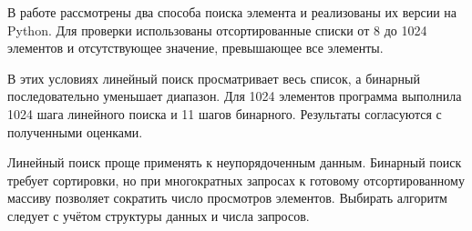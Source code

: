 \conclusion
В работе рассмотрены два способа поиска элемента и реализованы их версии
на Python. Для проверки использованы отсортированные списки от 8 до 1024
элементов и отсутствующее значение, превышающее все элементы.

В этих условиях линейный поиск просматривает весь список, а бинарный
последовательно уменьшает диапазон. Для 1024 элементов программа выполнила
1024 шага линейного поиска и 11 шагов бинарного. Результаты согласуются
с полученными оценками.

Линейный поиск проще применять к неупорядоченным данным. Бинарный поиск
требует сортировки, но при многократных запросах к готовому отсортированному
массиву позволяет сократить число просмотров элементов. Выбирать алгоритм
следует с учётом структуры данных и числа запросов.
